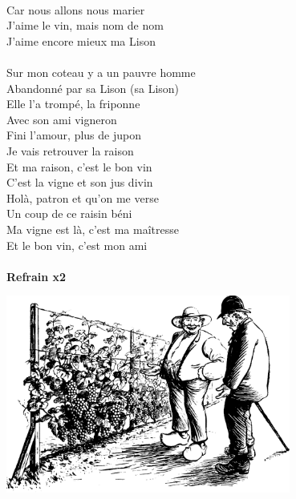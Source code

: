 \\Car nous allons nous marier
\\J'aime le vin, mais nom de nom
\\J'aime encore mieux ma Lison
\\\\Sur mon coteau y a un pauvre homme
\\Abandonné par sa Lison (sa Lison)
\\Elle l'a trompé, la friponne
\\Avec son ami vigneron
\\Fini l'amour, plus de jupon
\\Je vais retrouver la raison
\\Et ma raison, c'est le bon vin
\\C'est la vigne et son jus divin
\\Holà, patron et qu'on me verse
\\Un coup de ce raisin béni
\\Ma vigne est là, c'est ma maîtresse
\\Et le bon vin, c'est mon ami
\\\\\textbf{Refrain x2}
\vspace{0.5cm}
\begin{center}
\includegraphics[width=0.7\textwidth]{images/brev5.png}
\end{center}
\breakpage